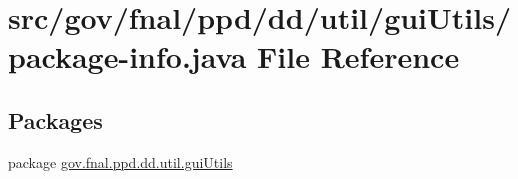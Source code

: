 \hypertarget{gov_2fnal_2ppd_2dd_2util_2guiUtils_2package-info_8java}{\section{src/gov/fnal/ppd/dd/util/gui\-Utils/package-\/info.java File Reference}
\label{gov_2fnal_2ppd_2dd_2util_2guiUtils_2package-info_8java}
}
\subsection*{Packages}
\begin{DoxyCompactItemize}
\item 
package \hyperlink{namespacegov_1_1fnal_1_1ppd_1_1dd_1_1util_1_1guiUtils}{gov.\-fnal.\-ppd.\-dd.\-util.\-gui\-Utils}
\end{DoxyCompactItemize}
